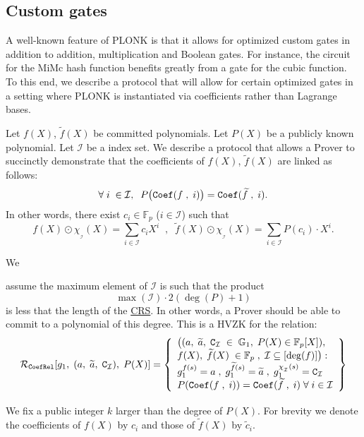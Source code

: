 \documentclass[11pt, lettersize, notitlepage, leqno, footskip=0.6cm]{article}
\newcommand{\bFp}{\mathbb{F}_p}
\newcommand{\wti}{\widetilde}
\newcommand{\mc}{\mathcal}
\newcommand{\mb}{\mathbb}
\newcommand{\sub}{\subseteq}
\newcommand{\vs}{\vspace{-0.15cm}}
\numberwithin{equation}{section}
\begin{document}
\subsection{\fontsize{11}{11}\selectfont Custom gates}

A well-known feature of PLONK is that it allows for optimized custom gates in addition to addition, multiplication and Boolean gates. For instance, the circuit for the MiMc hash function benefits greatly from a gate for the cubic function. To this end, we describe a protocol that will allow for certain optimized gates in a setting where PLONK is instantiated via coefficients rather than Lagrange bases.

Let $f(X)$, $\wti{f}(X)$ be committed polynomials. Let $P(X)$ be a publicly known polynomial. Let $\mc{I}$ be a index set. We describe a protocol that allows a Prover to succinctly demonstrate that the coefficients of $f(X)$, $\wti{f}(X)$ are linked as follows: \vs $$ \forall\;i\;\in\mc{I},\;\;P\big({\tt{Coef}}(f\;,\;i)\big) = {\tt{Coef}}(\wti{f}\;,\;i).$$ In other words, there exist $c_i\in \bFp$ ($i\in \mc{I}$) such that \vs $$f(X)\odot \chi_{_{\mc{I}}}(X) = \sum\limits_{i\in \mc{I}} c_iX^i\;\;,\;\; \wti{f}(X)\odot \chi_{_{\mc{I}}}(X) = \sum\limits_{i\in \mc{I}} P(c_i)\cdot X^i.    $$ 
 

\hypertarget{CoefRel}{We} assume the maximum element of $\mc{I}$ is such that the product \vs $$\max(\mc{I})\cdot 2(\deg(P)+1) $$ is less that the length of the \hyperlink{CRS}{CRS}. In other words, a Prover should be able to commit to a polynomial of this degree. This is a HVZK for the relation: $$\mc{R}_{\tt{CoefRel}}[g_1,\;(a,\;\wti{a},\; {\tt{C}}_{\mc{I}} ),\; P(X)] = \left\{\begin{array}{l} \big((a,\;  \wti{a},\;{\tt{C}}_{\mc{I}}\;\in\;\mb{G}_1,\; P(X)\in \bFp[X]),\\
f(X),\;\wti{f}(X)\;\in \bFp\;,\; \mc{I} \sub [\deg(f)]\big): \\
g_1^{f(s)} = a\;,\;g_1^{\wti{f}(s)} = \wti{a}\;,\;g_1^{\chi_{_{\mc{I}}}(s)} = \tt{C}_{\mc{I}} \\ \vspace{0.5mm}
P({\tt{Coef}}(f\;,\; i)) = {\tt{Coef}}(\wti{f}\;,\; i) \;\forall\; i\in \mc{I}\\

\end{array}\right\}  $$


We fix a public integer $k$ larger than the degree of $P(X)$. For brevity we denote the coefficients of $f(X)$ by $c_i$ and those of $\wti{f}(X)$ by $\wti{c}_i$.\bigskip
\end{document}
